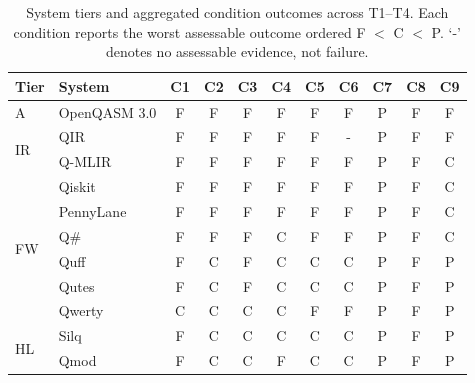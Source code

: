 \begin{table}[htbp]
    \centering
    \caption{System tiers and aggregated condition outcomes across T1--T4.
    Each condition reports the worst assessable outcome ordered F $<$ C $<$ P.
    `-' denotes no assessable evidence, not failure.}
    \label{tab:system_assessments:system_summary}
    \footnotesize
    \setlength{\tabcolsep}{2pt}
    \begin{tabular}{@{}llccccccccc@{}}
        \toprule
        \textbf{Tier} & \textbf{System} & \textbf{C1} & \textbf{C2} & \textbf{C3} & \textbf{C4} & \textbf{C5} & \textbf{C6} & \textbf{C7} & \textbf{C8} & \textbf{C9} \\
        \midrule
        A             & OpenQASM 3.0    & F           & F           & F           & F           & F           & F           & P           & F           & F           \\
        \midrule
        \multirow{2}{*}{IR}
        & QIR             & F           & F           & F           & F           & F           & -           & P           & F           & F           \\
        & Q-MLIR          & F           & F           & F           & F           & F           & F           & P           & F           & C           \\
        \midrule
        \multirow{6}{*}{FW}
        & Qiskit          & F           & F           & F           & F           & F           & F           & P           & F           & C           \\
        & PennyLane       & F           & F           & F           & F           & F           & F           & P           & F           & C           \\
        & Q\#             & F           & F           & F           & C           & F           & F           & P           & F           & C           \\
        & Quff            & F           & C           & F           & C           & C           & C           & P           & F           & P           \\
        & Qutes           & F           & C           & F           & C           & C           & C           & P           & F           & P           \\
        & Qwerty          & C           & C           & C           & C           & F           & F           & P           & F           & P           \\
        \midrule
        \multirow{2}{*}{HL}
        & Silq            & F           & C           & C           & C           & C           & C           & P           & F           & P           \\
        & Qmod            & F           & C           & C           & F           & C           & C           & P           & F           & P           \\
        \bottomrule
    \end{tabular}
\end{table}

